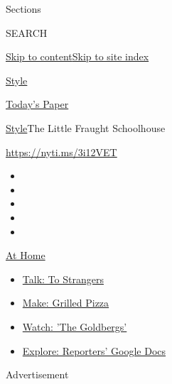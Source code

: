 Sections

SEARCH

\protect\hyperlink{site-content}{Skip to
content}\protect\hyperlink{site-index}{Skip to site index}

\href{https://www.nytimes3xbfgragh.onion/section/style}{Style}

\href{https://myaccount.nytimes3xbfgragh.onion/auth/login?response_type=cookie\&client_id=vi}{}

\href{https://www.nytimes3xbfgragh.onion/section/todayspaper}{Today's
Paper}

\href{/section/style}{Style}\textbar{}The Little Fraught Schoolhouse

\url{https://nyti.ms/3i12VET}

\begin{itemize}
\item
\item
\item
\item
\item
\end{itemize}

\href{https://www.nytimes3xbfgragh.onion/spotlight/at-home?action=click\&pgtype=Article\&state=default\&region=TOP_BANNER\&context=at_home_menu}{At
Home}

\begin{itemize}
\tightlist
\item
  \href{https://www.nytimes3xbfgragh.onion/2020/08/03/well/family/the-benefits-of-talking-to-strangers.html?action=click\&pgtype=Article\&state=default\&region=TOP_BANNER\&context=at_home_menu}{Talk:
  To Strangers}
\item
  \href{https://www.nytimes3xbfgragh.onion/2020/08/01/at-home/coronavirus-make-pizza-on-a-grill.html?action=click\&pgtype=Article\&state=default\&region=TOP_BANNER\&context=at_home_menu}{Make:
  Grilled Pizza}
\item
  \href{https://www.nytimes3xbfgragh.onion/2020/07/31/arts/television/goldbergs-abc-stream.html?action=click\&pgtype=Article\&state=default\&region=TOP_BANNER\&context=at_home_menu}{Watch:
  'The Goldbergs'}
\item
  \href{https://www.nytimes3xbfgragh.onion/interactive/2020/at-home/even-more-reporters-editors-diaries-lists-recommendations.html?action=click\&pgtype=Article\&state=default\&region=TOP_BANNER\&context=at_home_menu}{Explore:
  Reporters' Google Docs}
\end{itemize}

Advertisement

